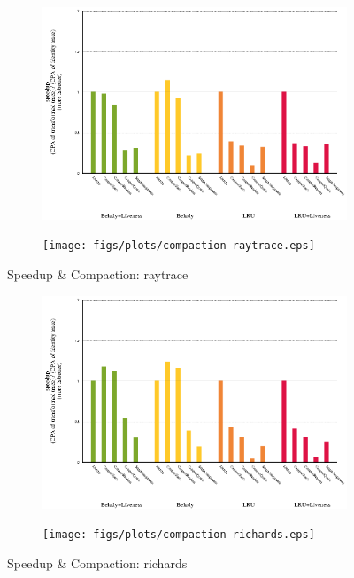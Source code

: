 \begin{figure}[!ht]
  \begin{subfigure}[b]{0.5\textwidth}%
    \includegraphics[width=\textwidth]{figs/plots/speedup-raytrace.eps}
  \end{subfigure}%
  \begin{subfigure}[b]{0.5\textwidth}%
    \texttt{[image: figs/plots/compaction-raytrace.eps]}
  \end{subfigure}%
    \caption{Speedup \& Compaction: raytrace}
  \label{fig:speedup-compaction-raytrace}
\end{figure}

\begin{figure}[!ht]
  \begin{subfigure}[b]{0.5\textwidth}%
    \includegraphics[width=\textwidth]{figs/plots/speedup-richards.eps}
  \end{subfigure}%
  \begin{subfigure}[b]{0.5\textwidth}%
    \texttt{[image: figs/plots/compaction-richards.eps]}
  \end{subfigure}%
  \caption{Speedup \& Compaction: richards}
  \label{fig:speedup-compaction-richards}
\end{figure}

